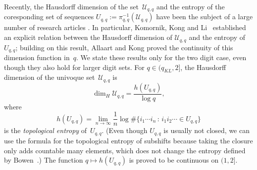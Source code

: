 \documentclass{amsart}
\theoremstyle{definition}
\numberwithin{equation}{section}
\newcommand{\cU}{\mathcal{U}}
\begin{document}
Recently, the Hausdorff dimension of the set~$\cU_{q,q}$ and the entropy of the coresponding set of sequences $U_{q,q} := \pi^{-1}_{q, q}(\cU_{q,q})$ have been the subject of a large number of research articles \cite{KongLi2015, KomKonLi2017, AlcBarBakKon2019,AllKong2019,KalKonLiLu2019,AllBakKong2019,KonLiLuWanXu2020,AllKong2021a,AllKong2021b}.
In particular, Komornik, Kong and Li~\cite{KomKonLi2017} established an explicit relation between the Hausdorff dimension of $\cU_{q,q}$ and the entropy of $U_{q, q}$; building on this result, Allaart and Kong \cite{AllKong2019} proved the continuity of this dimension function in~$q$.
We state these results only for the two digit case, even though they also hold for larger digit sets.
For $q\in (q_{KL}, 2]$, the Hausdorff dimension of the univoque set~$\cU_{q,q}$ is
\begin{equation*}\label{e:HausdorffD-KKL}
\dim_H{\cU_{q,q}} = \frac{h(U_{q,q})}{\log q},
\end{equation*}
where 
\[
h(U_{q,q}) = \lim_{n\to\infty} \frac{1}{n} \log \#\{i_1\cdots i_n \,:\, i_1i_2\cdots \in U_{q,q}\}
\]
is the \emph{topological entropy} of~$U_{q,q}$.
(Even though $U_{q,q}$ is usually not closed, we can use the formula for the topological entropy of subshifts because taking the closure only adds countable many elements, which does not change the entropy defined by Bowen~\cite{Bow1973}.)
The function $q \mapsto h(U_{q,q})$ is proved to be continuous on $(1, 2]$. 
\end{document}
